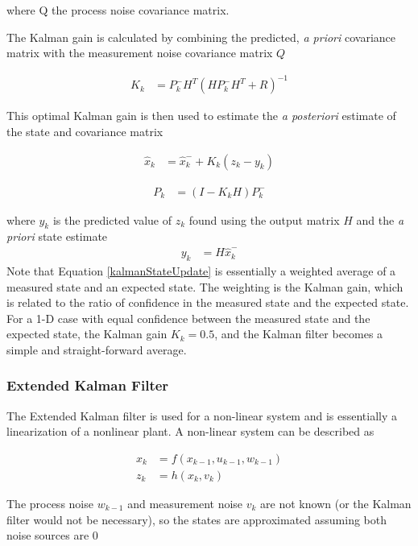 \documentclass[]{aiaa-tc}%
\begin{document}
where Q the process noise covariance matrix.

The Kalman gain is calculated by combining the predicted, \textit{a priori} covariance matrix with the measurement noise covariance matrix $Q$

\begin{align}
K_k &=P^-_kH^T(HP^-_kH^T + R)^{-1}
\end{align}

This optimal Kalman gain is then used to estimate the \textit{a posteriori} estimate of the state and covariance matrix

\begin{align}
\label{kalmanStateUpdate}
\hat{x}_k &=\hat{x}^-_k+K_k(z_k-y_k)
\end{align}

\begin{align}
P_k &= (I-K_kH)P^-_k
\end{align}

where $y_k$ is the predicted value of $z_k$ found using the output matrix $H$ and the \textit{a priori} state estimate
\begin{align}
y_k &= H\hat{x}^-_k
\end{align}
Note that Equation \ref{kalmanStateUpdate} is essentially a weighted average of a measured state and an expected state. The weighting is the Kalman gain, which is related to the ratio of confidence in the measured state and the expected state. For a 1-D case with equal confidence between the measured state and the expected state, the Kalman gain $K_k = 0.5$, and the Kalman filter becomes a simple and straight-forward average.


\subsubsection*{Extended Kalman Filter}
\label{EKFTheory}
The Extended Kalman filter is used for a non-linear system and is essentially a linearization of a nonlinear plant. A non-linear system can be described as \cite{welch1995introduction}

\begin{align}
x_k &= f(x_{k-1},u_{k-1},w_{k-1})\\
z_k &= h(x_k,v_k)
\end{align}

The process noise $w_{k-1}$ and measurement noise $v_k$ are not known (or the Kalman filter would not be necessary), so the states are approximated assuming both noise sources are 0
\end{document}
